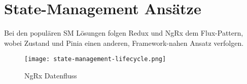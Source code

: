 \chapter{State-Management Ansätze}

Bei den populären SM Lösungen folgen Redux und NgRx dem Flux-Pattern\cite{historyOfRedux}\cite{ngrxGettingStarted}, wobei Zustand und Pinia einen anderen, Framework-nahen Ansatz verfolgen.

\begin{figure}[h!]
\texttt{[image: state-management-lifecycle.png]}
\caption{NgRx Datenfluss}
\end{figure}